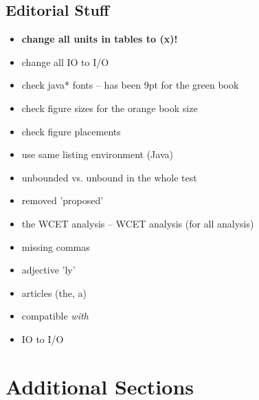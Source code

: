 \subsection{Editorial Stuff}

\begin{itemize}
  \item \textbf{change all units in tables to (x)!}
  \item change all IO to I/O
  \item check java* fonts -- has been 9pt for the green book
  \item check figure sizes for the orange book size
  \item check figure placements
  \item use same listing environment (Java)
  \item unbounded vs. unbound in the whole test
  \item removed 'proposed'
  \item the WCET analysis -- WCET analysis (for all analysis)
  \item missing commas
  \item adjective 'ly'
  \item articles (the, a)
  \item compatible \emph{with}
  \item IO to I/O
\end{itemize}

\section{Additional Sections}

